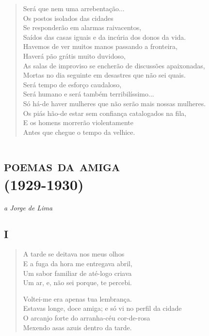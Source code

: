 \begin{verse}
Será que nem uma arrebentação...\\
Os postos isolados das cidades\\
Se responderão em alarmas raivacentos,\\
Saídos das casas iguais e da incúria dos donos da vida.\\
Havemos de ver muitos manos passando a fronteira,\\
Haverá pão grátis muito duvidoso,\\
As salas de improviso se encherão de discussões apaixonadas,\\
Mortas no dia seguinte em desastres que não sei quais.\\
Será tempo de esforço caudaloso,\\
Será humano e será também terribilíssimo...\\
Só há-de haver mulheres que não serão mais nossas mulheres.\\
Os piás hão-de estar sem confiança catalogados na fila,\\
E os homens morrerão violentamente\\
Antes que chegue o tempo da velhice.
\end{verse}

\chapter[\textsc{poemas da amiga}\\I -- ``A tarde se deitava nos meus olhos'']{\textsc{poemas da amiga}\\(1929-1930)}

\begin{flushright}
\emph{a Jorge de Lima}
\end{flushright}

\section{I}

\begin{verse}
A tarde se deitava nos meus olhos\\
E a fuga da hora me entregava abril,\\
Um sabor familiar de até-logo criava\\
Um ar, e, não sei porque, te percebi.

Voltei-me era apenas tua lembrança.\\
Estavas longe, doce amiga; e só vi no perfil da cidade\\
O arcanjo forte do arranha-céu cor-de-rosa\\
Mexendo asas azuis dentro da tarde.
\end{verse}


